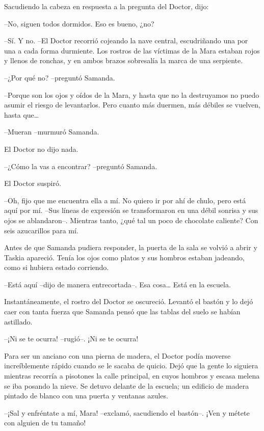 Sacudiendo la cabeza en respuesta a la pregunta del Doctor, dijo:

--No, siguen todos dormidos. Eso es bueno, ¿no?

--Sí. Y no. --El Doctor recorrió cojeando la nave central, escudriñando una por una a cada forma durmiente. Los rostros de las víctimas de la Mara estaban rojos y llenos de ronchas, y en ambos brazos sobresalía la marca de una serpiente.

--¿Por qué no? --preguntó Samanda.

--Porque son los ojos y oídos de la Mara, y hasta que no la destruyamos no puedo asumir el riesgo de levantarlos. Pero cuanto más duermen, más débiles se vuelven, hasta que…

--Mueran --murmuró Samanda.

El Doctor no dijo nada.

--¿Cómo la vas a encontrar? --preguntó Samanda.

El Doctor suspiró.

--Oh, fijo que me encuentra ella a mí. No quiero ir por ahí de chulo, pero está aquí por mí. --Sus líneas de expresión se transformaron en una débil sonrisa y sus ojos se ablandaron--. Mientras tanto, ¿qué tal un poco de chocolate caliente? Con seis azucarillos para mí.

Antes de que Samanda pudiera responder, la puerta de la sala se volvió a abrir y Taskia apareció. Tenía los ojos como platos y sus hombros estaban jadeando, como si hubiera estado corriendo.

--Está aquí --dijo de manera entrecortada--. Esa cosa… Está en la escuela.

Instantáneamente, el rostro del Doctor se oscureció. Levantó el bastón y lo dejó caer con tanta fuerza que Samanda pensó que las tablas del suelo se habían astillado.

--¡Ni se te ocurra! --rugió--. ¡Ni se te ocurra!



Para ser un anciano con una pierna de madera, el Doctor podía moverse increíblemente rápido cuando se le sacaba de quicio. Dejó que la gente lo siguiera mientras recorría a pisotones la calle principal, en cuyos hombros y escasa melena se iba posando la nieve. Se detuvo delante de la escuela; un edificio de madera pintado de blanco con una puerta y ventanas azules.

--¡Sal y enfréntate a mí, Mara! --exclamó, sacudiendo el bastón--. ¡Ven y métete con alguien de tu tamaño!

